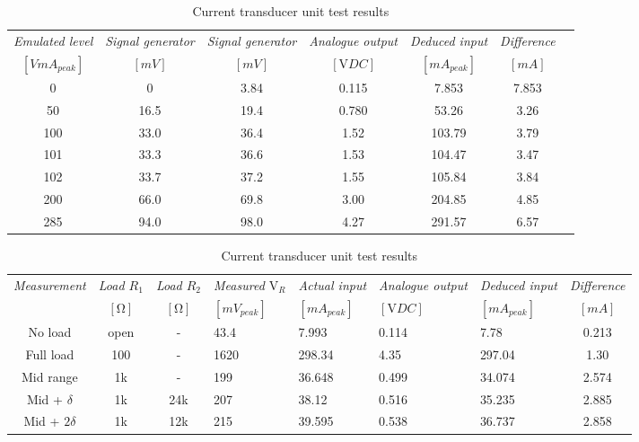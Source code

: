 \begin{table}[h]
        \centering
        \footnotesize
        \caption{Current transducer unit test results}
         \begin{tabular}{ccccccc}
          \toprule
             \textit{\footnotesize Emulated level} & \textit{\footnotesize Signal generator} & \textit{\footnotesize Signal generator} & \textit{{\footnotesize Analogue output}} & \textit{\footnotesize Deduced input} & \textit{\footnotesize Difference}\\
             $[VmA_{peak}]$ & $[mV]$ & $[mV]$ & $[\si{\volt}DC]$ & $[mA_{peak}]$ & $[mA]$ \\
          \hline
          0 & 0 & 3.84 & 0.115 & 7.853 & 7.853 \\
          50 & 16.5 & 19.4 & 0.780 & 53.26 & 3.26 \\
          100 & 33.0 & 36.4 & 1.52 & 103.79 & 3.79 \\
          101 & 33.3 & 36.6 & 1.53 & 104.47 & 3.47 \\
          102 & 33.7 & 37.2 & 1.55 & 105.84 & 3.84 \\
          200 & 66.0 & 69.8 & 3.00 & 204.85 & 4.85 \\
          285 & 94.0 & 98.0 & 4.27 & 291.57 & 6.57 \\
         \hline
        \end{tabular}
     \label{tab:current_unit_test}
\end{table}

\begin{table}[h]
        \centering
        \footnotesize
        \caption{Current transducer unit test results}
         \begin{tabular}{ccc|p{1.8cm}p{1.8cm}p{1.8cm}p{1.8cm}c}
          \toprule
             \textit{\footnotesize Measurement} & \textit{\footnotesize Load $R_1$} & \textit{\footnotesize Load $R_2$} & \textit{{\footnotesize Measured $\si{\volt}_R$}} & \textit{{\footnotesize Actual input}} & \textit{{\footnotesize Analogue output}} & \textit{\footnotesize Deduced input} & \textit{\footnotesize Difference}\\
             & $[\si{\ohm}]$ & $[\si{\ohm}]$ & $[mV_{peak}]$ & $[mA_{peak}]$ & $[\si{\volt}DC]$ & $[mA_{peak}]$ & $[mA]$ \\
          \hline
          No load & open & - & 43.4 & 7.993 & 0.114 & 7.78 & 0.213 \\
          Full load & 100 & - & 1620 & 298.34 & 4.35 & 297.04 & 1.30 \\
          Mid range & 1k & - & 199 & 36.648 & 0.499 & 34.074 & 2.574 \\
          Mid + $\delta$ & 1k & 24k & 207 & 38.12 & 0.516 & 35.235 & 2.885 \\
          Mid + $2\delta$ & 1k & 12k & 215 & 39.595 & 0.538 & 36.737 & 2.858 \\
          \hline
        \end{tabular}
     \label{tab:current_integrated_test}
\end{table}







